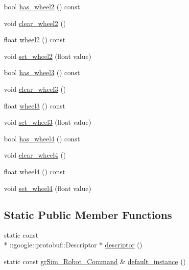 \begin{DoxyCompactItemize}
\item 
bool \hyperlink{classgr_sim___robot___command_a08c29edf76f51339f2c39b912fa2cedc}{has\-\_\-wheel2} () const 
\item 
void \hyperlink{classgr_sim___robot___command_ab9ec8e5e23b73fcf95144712b9ebf6c4}{clear\-\_\-wheel2} ()
\item 
float \hyperlink{classgr_sim___robot___command_a58fc235bd37d62da61cf4dcfdb6de90d}{wheel2} () const 
\item 
void \hyperlink{classgr_sim___robot___command_a9f417ede16d73389f94c692d4dd4cdfb}{set\-\_\-wheel2} (float value)
\item 
bool \hyperlink{classgr_sim___robot___command_a71ca3e22e63c27a219bffa65b6143609}{has\-\_\-wheel3} () const 
\item 
void \hyperlink{classgr_sim___robot___command_a2b60e69f52973314fa73a534490d9b2d}{clear\-\_\-wheel3} ()
\item 
float \hyperlink{classgr_sim___robot___command_a17ac79d0407b2756b8c5615574cfd775}{wheel3} () const 
\item 
void \hyperlink{classgr_sim___robot___command_aab77ab6a37234210cd338b7cc0c5f722}{set\-\_\-wheel3} (float value)
\item 
bool \hyperlink{classgr_sim___robot___command_aa42f620797c600ebf30498c449c93cc4}{has\-\_\-wheel4} () const 
\item 
void \hyperlink{classgr_sim___robot___command_abb9655cf430d1fa134c552189f160425}{clear\-\_\-wheel4} ()
\item 
float \hyperlink{classgr_sim___robot___command_aea69940feee58122f0a305f2cd3c1e94}{wheel4} () const 
\item 
void \hyperlink{classgr_sim___robot___command_aeeeb78277ae9036809e91cabe260ade7}{set\-\_\-wheel4} (float value)
\end{DoxyCompactItemize}
\subsection*{Static Public Member Functions}
\begin{DoxyCompactItemize}
\item 
static const \\*
\-::google\-::protobuf\-::\-Descriptor $\ast$ \hyperlink{classgr_sim___robot___command_a339a4252e0931d0d49ea14b7e4db5ff1}{descriptor} ()
\item 
static const \hyperlink{classgr_sim___robot___command}{gr\-Sim\-\_\-\-Robot\-\_\-\-Command} \& \hyperlink{classgr_sim___robot___command_afa93989158e8f7980e3a350fde09a1be}{default\-\_\-instance} ()
\end{DoxyCompactItemize}
